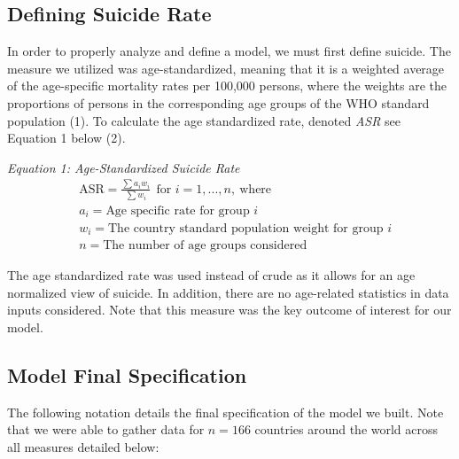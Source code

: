 \documentclass[]{article}
\begin{document}
\newpage

\subsection{Defining Suicide Rate}\label{defining-suicide-rate}

In order to properly analyze and define a model, we must first define
suicide. The measure we utilized was age-standardized, meaning that it
is a weighted average of the age-specific mortality rates per 100,000
persons, where the weights are the proportions of persons in the
corresponding age groups of the WHO standard population (1). To
calculate the age standardized rate, denoted \emph{ASR} see Equation 1
below (2).

\emph{Equation 1: Age-Standardized Suicide Rate} \[
\begin{aligned}
& \text{ASR} = \frac{\sum{a_i w_i}}{\sum{w_i}} \ \ \text{for } i = 1,...,n,\ \text{where}\\
& a_i = \text{Age specific rate for group } i \\
& w_i = \text{The country standard population weight for group } i \\
& n = \text{The number of age groups considered}
\end{aligned}
\]

The age standardized rate was used instead of crude as it allows for an
age normalized view of suicide. In addition, there are no age-related
statistics in data inputs considered. Note that this measure was the key
outcome of interest for our model.

\subsection{Model Final Specification}\label{model-final-specification}

The following notation details the final specification of the model we
built. Note that we were able to gather data for \(n=166\) countries
around the world across all measures detailed below:
\end{document}
